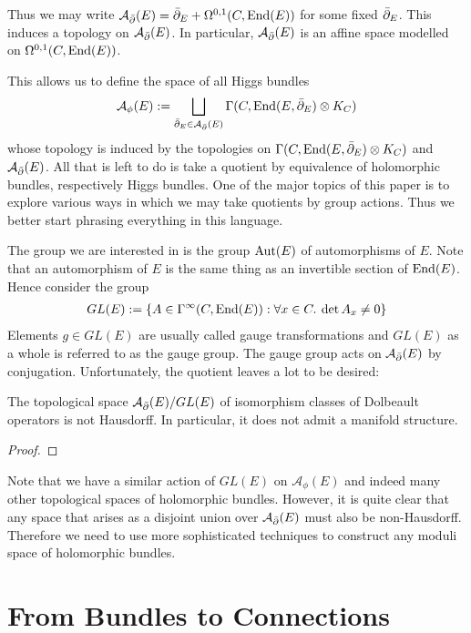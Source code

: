 \documentclass[12pt]{ociamthesis}  %
\begin{document}
Thus we may write $\mathcal A_{\bar{\partial}} (E) = {\bar{\partial}}_E + \Omega^{0,1}(C,\operatorname{End}(E))$
for some fixed ${\bar{\partial}}_E$. This induces a topology on $\mathcal A_{\bar{\partial}} (E)$.
In particular, $\mathcal A_{\bar{\partial}} (E)$ is an affine space modelled on
$\Omega^{0,1}(C,\operatorname{End}(E))$.

This allows us to define the space of all Higgs bundles
\begin{align*}
  \mathcal A_\phi(E) := \bigsqcup_{{\bar{\partial}}_E \in \mathcal A_{\bar{\partial}} (E)} \Gamma(C,\operatorname{End}(E,{\bar{\partial}}_E)\otimes K_C)
\end{align*}
whose topology is induced by the topologies on
$\Gamma(C,\operatorname{End}(E,{\bar{\partial}}_E)\otimes K_C)$ and $\mathcal A_{\bar{\partial}} (E)$.
All that is left to do is take a quotient by equivalence of holomorphic
bundles, respectively Higgs bundles. One of the major topics of this
paper is to explore various ways in which we may take quotients by
group actions. Thus we better start phrasing everything in this language.

The group we are interested in is the group $\operatorname{Aut}(E)$ of automorphisms
of $E$. Note that an automorphism of $E$ is the same thing as
an invertible section of $\operatorname{End}(E)$. Hence consider the group
\begin{align*}
  GL(E) := \{A \in \Gamma^\infty(C,\operatorname{End}(E)) : \forall x \in C.\:\det A_x \neq 0\}
\end{align*}
Elements $g\in GL(E)$ are usually called gauge transformations and
$GL(E)$ as a whole is referred to as the gauge group.
The gauge group acts on $\mathcal A_{\bar{\partial}}(E)$ by conjugation.
Unfortunately, the quotient leaves a lot to be desired:
\begin{lemma}
  The topological space $\mathcal A_{\bar{\partial}} (E)/GL(E)$ of isomorphism classes of
  Dolbeault operators is not Hausdorff. In particular, it does not
  admit a manifold structure.
  \begin{proof}
    \missingproof
  \end{proof}
\end{lemma}

Note that we have a similar action of $GL(E)$ on $\mathcal A_\phi(E)$ and
indeed many other topological spaces of holomorphic bundles. However,
it is quite clear that any space that arises as a disjoint union
over $\mathcal A_{\bar{\partial}} (E)$ must also be non-Hausdorff. Therefore we need
to use more sophisticated techniques to construct any moduli
space of holomorphic bundles.

\section{From Bundles to Connections}
\end{document}
